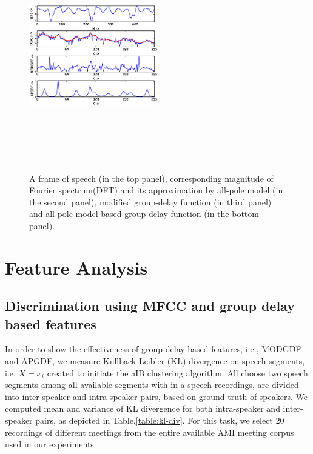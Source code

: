 \documentclass[conference]{IEEEtran}
\begin{document}
\begin{figure}[h]
\centering
\includegraphics[width=0.5\textwidth,height=10cm]{figures/apSpectrum.eps}
\caption{ A frame of speech (in the top panel), corresponding magnitude of
Fourier spectrum(DFT) and its approximation by all-pole model (in the second
panel), modified group-delay function (in third panel) and all pole model based
group delay function (in the bottom panel).}
\label{fig:all-pole}
\end{figure}



\section{Feature Analysis}
\label{feature_analysis_and_fusion}

\subsection{Discrimination using MFCC and group delay based features}
\label{feature_analysis}
In order to show the effectiveness of group-delay based features, i.e., MODGDF
and APGDF, we measure Kullback-Leibler (KL) divergence on speech segments, i.e.
$X={x_i}$ created to initiate the aIB clustering algorithm. All choose two
speech segments among all available segments with in a speech recordings, are
divided into inter-speaker and intra-speaker pairs, based on ground-truth of
speakers. We computed mean and variance of KL divergence for both intra-speaker
and inter-speaker pairs, as depicted in Table.\ref{table:kl-div}. For this task,
we select $20$ recordings of different meetings from the entire available AMI
meeting corpus used in our experiments. 
\end{document}
